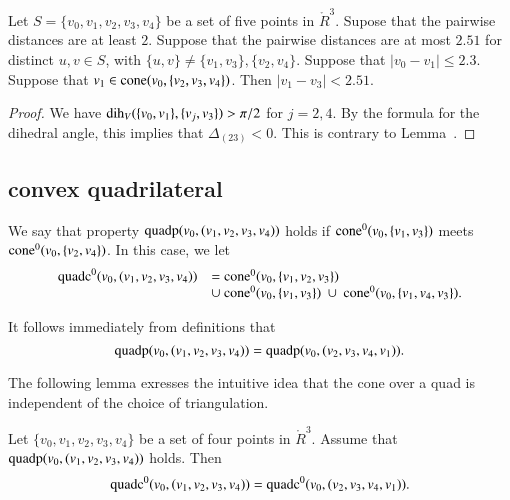 \begin{lemma}
Let $S=\{v_0,v_1,v_2,v_3,v_4\}$ be a set of
five points in $\ring{R}^3$.  Supose that the pairwise
distances are at least $2$.  Suppose that the pairwise
distances are at most $2.51$ for distinct $u,v\in S$, with
$\{u,v\}\ne \{v_1,v_3\}, \{v_2,v_4\}$.  Suppose that $|v_0-v_1|\le 2.3$.
Suppose that $v_1\in{\operatorname{cone}}(v_0,\{v_2,v_3,v_4\})$.
Then $|v_1-v_3|< 2.51$.  
\end{lemma}

\begin{proof}
We have $\operatorname{dih}_V(\{v_0,v_1\},\{v_j,v_3\})>\pi/2$ for $j=2,4$.
  By the formula for the dihedral angle, this
implies that $\Delta_{(23)}<0$.  This is contrary to Lemma~.
\end{proof}



\newpage

\subsection{convex quadrilateral}

\begin{definition}
We say that property ${\operatorname{quadp}}(v_0,(v_1,v_2,v_3,v_4))$  holds if
${\operatorname{cone}}^0(v_0,\{v_1,v_3\})$ meets ${\operatorname{cone}}^0(v_0,\{v_2,v_4\})$.
In this case, we let 
 $$\begin{array}{lll}
   \op{quadc}^0(v_0,(v_1,v_2,v_3,v_4))&= 
    \op{cone}^0(v_0,\{v_1,v_2,v_3\})  \\
    &\cup \ \op{cone}^0(v_0,\{v_1,v_3\})\ \cup \ 
   \op{cone}^0(v_0,\{v_1,v_4,v_3\}).
  \end{array}$$
\end{definition}

It follows immediately from definitions that
  $${\operatorname{quadp}}(v_0,(v_1,v_2,v_3,v_4))={\operatorname{quadp}}(v_0,(v_2,v_3,v_4,v_1)).$$

\newpage

The following lemma exresses the intuitive idea that the cone
over a quad is independent of the choice of triangulation.

\begin{lemma}
Let $\{v_0,v_1,v_2,v_3,v_4\}$ be a set of four points in $\ring{R}^3$.
Assume that ${\operatorname{quadp}}(v_0,(v_1,v_2,v_3,v_4))$ holds.
Then 
 $${\operatorname{quadc}}^0(v_0,(v_1,v_2,v_3,v_4))  
  = {\operatorname{quadc}}^0(v_0,(v_2,v_3,v_4,v_1)).
 $$
\end{lemma}

